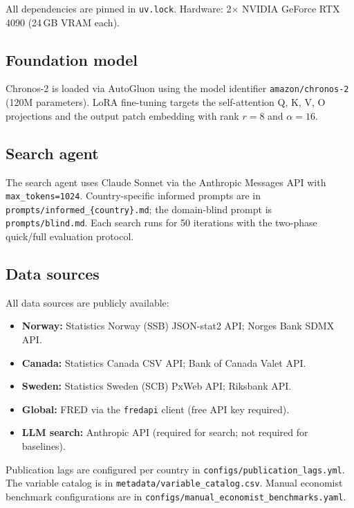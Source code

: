 \documentclass[12pt,a4paper]{article}
\begin{document}
\begin{appendices}
\noindent All dependencies are pinned in \texttt{uv.lock}. Hardware: 2$\times$ NVIDIA GeForce RTX 4090 (24\,GB VRAM each).

\subsection*{Foundation model}

Chronos-2 is loaded via AutoGluon using the model identifier \texttt{amazon/chronos-2} (120M parameters). LoRA fine-tuning targets the self-attention Q, K, V, O projections and the output patch embedding with rank $r = 8$ and $\alpha = 16$.

\subsection*{Search agent}

The search agent uses Claude Sonnet via the Anthropic Messages API with \texttt{max\_tokens=1024}. Country-specific informed prompts are in \texttt{prompts/informed\_\{country\}.md}; the domain-blind prompt is \texttt{prompts/blind.md}. Each search runs for 50 iterations with the two-phase quick/full evaluation protocol.

\subsection*{Data sources}

All data sources are publicly available:
\begin{itemize}[noitemsep]
    \item \textbf{Norway:} Statistics Norway (SSB) JSON-stat2 API; Norges Bank SDMX API.
    \item \textbf{Canada:} Statistics Canada CSV API; Bank of Canada Valet API.
    \item \textbf{Sweden:} Statistics Sweden (SCB) PxWeb API; Riksbank API.
    \item \textbf{Global:} FRED via the \texttt{fredapi} client (free API key required).
    \item \textbf{LLM search:} Anthropic API (required for search; not required for baselines).
\end{itemize}

\noindent Publication lags are configured per country in \texttt{configs/publication\_lags.yml}. The variable catalog is in \texttt{metadata/variable\_catalog.csv}. Manual economist benchmark configurations are in \texttt{configs/manual\_economist\_benchmarks.yaml}.


\end{appendices}
\end{document}
